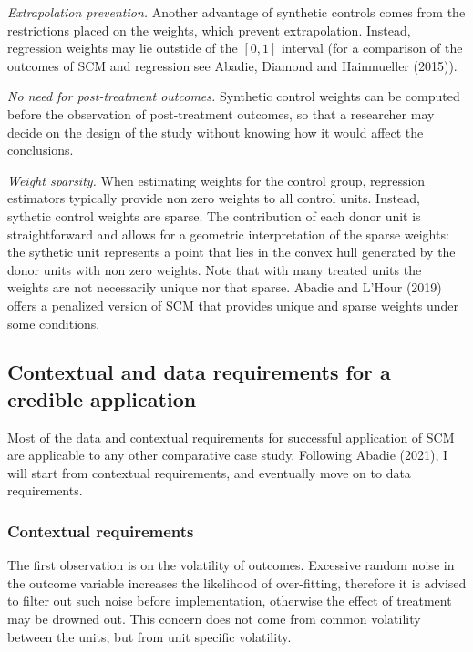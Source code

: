 \documentclass[12pt,a4paper,draft]{article}
\begin{document}
\emph{Extrapolation prevention.} Another advantage of synthetic controls comes from the 
restrictions placed on the weights, which prevent extrapolation. Instead, 
regression weights may lie outstide of the $[0,1]$ interval (for a comparison 
of the outcomes of SCM and regression see Abadie, Diamond and Hainmueller (2015)). 

\emph{No need for post-treatment outcomes.} Synthetic control weights can be computed 
before the observation of post-treatment outcomes, so that a researcher may decide 
on the design of the study without knowing how it would affect the conclusions.

\emph{Weight sparsity.} When estimating weights for 
the control group, regression estimators typically provide non zero weights to all control 
units. Instead, sythetic control weights are sparse. The contribution of each 
donor unit is straightforward and allows for a geometric interpretation of the 
sparse weights: the sythetic unit represents a point that lies in the convex hull 
generated by the donor units with non zero weights.
Note that with many treated units the weights are not necessarily unique nor 
that sparse. Abadie and L'Hour (2019) offers a penalized version of SCM that 
provides unique and sparse weights under some conditions.



\subsection{Contextual and data requirements for a credible application}

Most of the data and contextual requirements for successful application of 
SCM are applicable to any other comparative case study. Following Abadie (2021), I 
will start from contextual requirements, and eventually move on to data requirements.


\subsubsection{Contextual requirements}

The first observation is on the volatility of outcomes. Excessive random noise in the 
outcome variable increases the likelihood of over-fitting, therefore it is advised to 
filter out such noise before implementation, otherwise the effect of treatment 
may be drowned out. This concern does not come from common volatility between the 
units, but from unit specific volatility.
\end{document}
